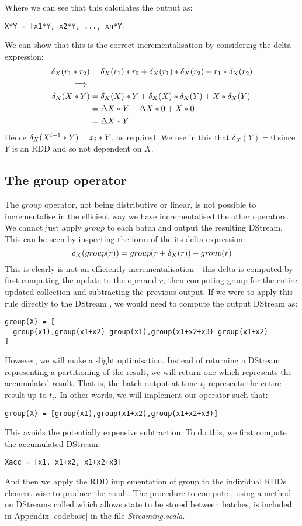 Where we can see that this calculates the output as:
\vs\begin{lstlisting}
X*Y = [x1*Y, x2*Y, ..., xn*Y]
\end{lstlisting}\vs
We can show that this is the correct incrementalisation by considering the delta expression:
\begin{equation*}
\begin{split}
\delta_X(r_1 * r_2) &= \delta_X(r_1)*r_2 + \delta_X(r_1)*\delta_X(r_2) + r_1*\delta_X(r_2) \\
\implies \\
\delta_X(X*Y)& = \delta_X(X)*Y + \delta_X(X)*\delta_X(Y) + X*\delta_X(Y) \\
	  &= \Delta X*Y + \Delta X*0 + X*0 \\
	  &= \Delta X*Y
\end{split}
\end{equation*}
Hence $\delta_X(X^{i-1}*Y) = x_i*Y$, as required. We use in this that $\delta_X(Y) = 0$ since $Y$ is an RDD and so not dependent on $X$.

\subsection{The group operator}
The $group$ operator, not being distributive or linear, is not possible to incrementalise in the efficient way we have incrementalised the other operators. We cannot just apply $group$ to each batch and output the resulting DStream. This can be seen by inspecting the form of the its delta expression:
\begin{equation*}
\delta_X(group(r)) = group(r + \delta_X(r)) - group(r)
\end{equation*}
This is clearly is not an efficiently incrementalisation - this delta is computed by first computing the update to the operand $r$, then computing group for the entire updated collection and subtracting the previous output. If we were to apply this rule directly to the DStream , we would need to compute the output DStream as:
\vs\begin{lstlisting}
group(X) = [
  group(x1),group(x1+x2)-group(x1),group(x1+x2+x3)-group(x1+x2)
]
\end{lstlisting}\vs
However, we will make a slight optimisation. Instead of returning a DStream representing a partitioning of the result, we will return one which represents the accumulated result. That is, the batch output at time $t_i$ represents the entire result up to $t_i$. In other words, we will implement our operator such that:
\vs\begin{lstlisting}
group(X) = [group(x1),group(x1+x2),group(x1+x2+x3)]
\end{lstlisting}\vs
This avoids the potentially expensive subtraction. To do this, we first compute the accumulated DStream:
\vs\begin{lstlisting}
Xacc = [x1, x1+x2, x1+x2+x3]
\end{lstlisting}
And then we apply the RDD implementation of group to the individual RDDs element-wise to produce the result. The procedure to compute , using a method on DStreams called  which allows state to be stored between batches, is included in Appendix \ref{codebase} in the file \textit{Streaming.scala}.


